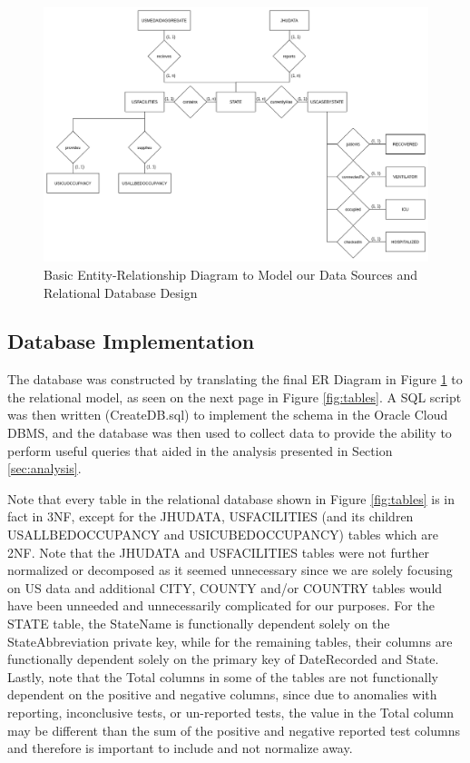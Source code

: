 \documentclass[11pt]{article}
\begin{document}
\FloatBarrier
\begin{figure}[h]
    \centering
    \includegraphics[width=\textwidth]{diagrams/ER1.png}
    \caption{Basic Entity-Relationship Diagram to Model our Data Sources and Relational Database Design}
    \label{fig:er1}
\end{figure}
\FloatBarrier

\pagebreak

\subsection{Database Implementation}
\label{subsec:implementation}

\noindent
The database was constructed by translating the final ER Diagram in Figure \ref{fig:er1} to the relational model, as seen on the next page in Figure \ref{fig:tables}. A SQL script was then written (CreateDB.sql) to implement the schema in the Oracle Cloud DBMS, and the database was then used to collect data to provide the ability to perform useful queries that aided in the analysis presented in Section \ref{sec:analysis}.

\noindent
Note that every table in the relational database shown in Figure \ref{fig:tables} is in fact in 3NF, except for the JHUDATA, USFACILITIES (and its children USALLBEDOCCUPANCY and USICUBEDOCCUPANCY) tables which are 2NF. Note that the JHUDATA  and USFACILITIES tables were not further normalized or decomposed as it seemed unnecessary since we are solely focusing on US data and additional CITY, COUNTY and/or COUNTRY tables would have been unneeded and unnecessarily complicated for our purposes. For the STATE table, the StateName is functionally dependent solely on the StateAbbreviation private key, while for the remaining tables, their columns are functionally dependent solely on the primary key of DateRecorded and State. Lastly, note that the Total columns in some of the tables are not functionally dependent on the positive and negative columns, since due to anomalies with reporting, inconclusive tests, or un-reported tests, the value in the Total column may be different than the sum of the positive and negative reported test columns and therefore is important to include and not normalize away.
\end{document}
